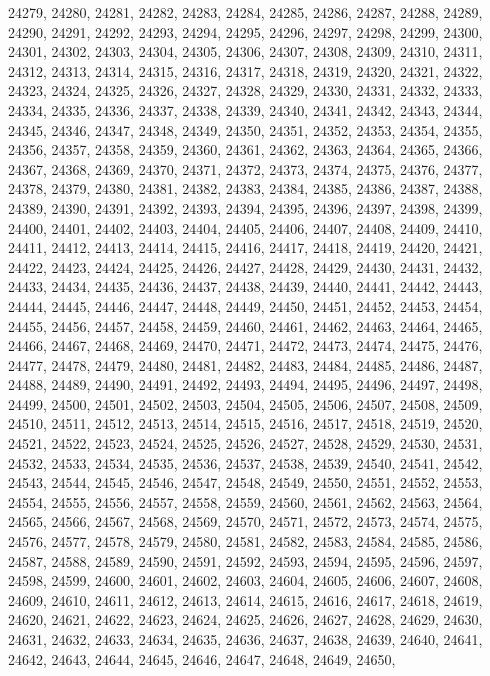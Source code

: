 24279,
24280,
24281,
24282,
24283,
24284,
24285,
24286,
24287,
24288,
24289,
24290,
24291,
24292,
24293,
24294,
24295,
24296,
24297,
24298,
24299,
24300,
24301,
24302,
24303,
24304,
24305,
24306,
24307,
24308,
24309,
24310,
24311,
24312,
24313,
24314,
24315,
24316,
24317,
24318,
24319,
24320,
24321,
24322,
24323,
24324,
24325,
24326,
24327,
24328,
24329,
24330,
24331,
24332,
24333,
24334,
24335,
24336,
24337,
24338,
24339,
24340,
24341,
24342,
24343,
24344,
24345,
24346,
24347,
24348,
24349,
24350,
24351,
24352,
24353,
24354,
24355,
24356,
24357,
24358,
24359,
24360,
24361,
24362,
24363,
24364,
24365,
24366,
24367,
24368,
24369,
24370,
24371,
24372,
24373,
24374,
24375,
24376,
24377,
24378,
24379,
24380,
24381,
24382,
24383,
24384,
24385,
24386,
24387,
24388,
24389,
24390,
24391,
24392,
24393,
24394,
24395,
24396,
24397,
24398,
24399,
24400,
24401,
24402,
24403,
24404,
24405,
24406,
24407,
24408,
24409,
24410,
24411,
24412,
24413,
24414,
24415,
24416,
24417,
24418,
24419,
24420,
24421,
24422,
24423,
24424,
24425,
24426,
24427,
24428,
24429,
24430,
24431,
24432,
24433,
24434,
24435,
24436,
24437,
24438,
24439,
24440,
24441,
24442,
24443,
24444,
24445,
24446,
24447,
24448,
24449,
24450,
24451,
24452,
24453,
24454,
24455,
24456,
24457,
24458,
24459,
24460,
24461,
24462,
24463,
24464,
24465,
24466,
24467,
24468,
24469,
24470,
24471,
24472,
24473,
24474,
24475,
24476,
24477,
24478,
24479,
24480,
24481,
24482,
24483,
24484,
24485,
24486,
24487,
24488,
24489,
24490,
24491,
24492,
24493,
24494,
24495,
24496,
24497,
24498,
24499,
24500,
24501,
24502,
24503,
24504,
24505,
24506,
24507,
24508,
24509,
24510,
24511,
24512,
24513,
24514,
24515,
24516,
24517,
24518,
24519,
24520,
24521,
24522,
24523,
24524,
24525,
24526,
24527,
24528,
24529,
24530,
24531,
24532,
24533,
24534,
24535,
24536,
24537,
24538,
24539,
24540,
24541,
24542,
24543,
24544,
24545,
24546,
24547,
24548,
24549,
24550,
24551,
24552,
24553,
24554,
24555,
24556,
24557,
24558,
24559,
24560,
24561,
24562,
24563,
24564,
24565,
24566,
24567,
24568,
24569,
24570,
24571,
24572,
24573,
24574,
24575,
24576,
24577,
24578,
24579,
24580,
24581,
24582,
24583,
24584,
24585,
24586,
24587,
24588,
24589,
24590,
24591,
24592,
24593,
24594,
24595,
24596,
24597,
24598,
24599,
24600,
24601,
24602,
24603,
24604,
24605,
24606,
24607,
24608,
24609,
24610,
24611,
24612,
24613,
24614,
24615,
24616,
24617,
24618,
24619,
24620,
24621,
24622,
24623,
24624,
24625,
24626,
24627,
24628,
24629,
24630,
24631,
24632,
24633,
24634,
24635,
24636,
24637,
24638,
24639,
24640,
24641,
24642,
24643,
24644,
24645,
24646,
24647,
24648,
24649,
24650,
